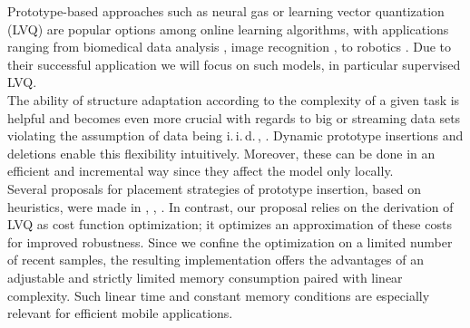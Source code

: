 \documentclass[conference]{IEEEtran}
\begin{document}
Prototype-based approaches such as neural gas \cite{martinetz:gas} or learning vector quantization (LVQ) \cite{kohonen-self-organizing-maps-2001} are popular options among 
online learning algorithms, with applications ranging from biomedical data analysis \cite{10.1371/journal.pone.0059401}, image recognition \cite{journals/neco/WersingK03}, 
to robotics \cite{Carlevarino00anincremental}. Due to their successful application we will focus on such models, in particular supervised LVQ.\\
The ability of structure adaptation according to the complexity of a given task is helpful and becomes even more crucial with regards to big or streaming data sets violating the assumption of data being i.\,i.\,d.\,\cite{Carlevarino00anincremental}, \cite{6853440}.
Dynamic prototype insertions and deletions enable this flexibility intuitively. Moreover, these can be done in an efficient and incremental way since they affect the model only locally. \\
Several proposals for placement strategies of prototype insertion, based on heuristics,  were made  in \cite{DBLP:conf/ijcnn/GrbovicV09}, \cite{DBLP:conf/esann/BermejoCP98}, \cite{PN0805}.
In contrast, our proposal relies on the derivation of LVQ
 as cost function optimization;
it optimizes an approximation of these costs for improved robustness. 
Since we confine the optimization on a limited number of recent samples, the resulting
implementation offers the advantages of an adjustable and strictly
limited memory consumption paired with linear complexity.
Such linear time and constant memory conditions are
especially relevant for efficient mobile applications. 
\end{document}

